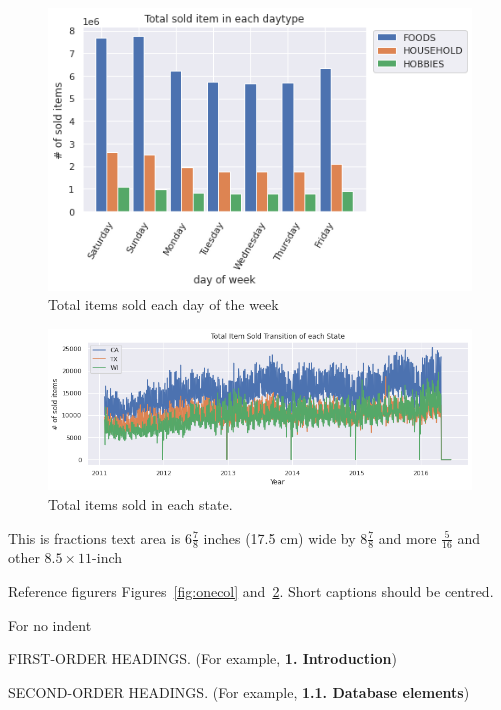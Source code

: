 \documentclass[10pt,twocolumn,letterpaper]{article}
\begin{document}
\begin{figure}
  \begin{center}
    \includegraphics[width=0.8\linewidth]{img/totalSoldItemInEachDayOfWeek.png}
  \end{center}
    \caption{Total items sold each day of the week}
  \label{fig:short}
\end{figure}

\begin{figure}
  \begin{center}
    \includegraphics[width=0.8\linewidth]{img/totalItemSoldInEachState.png}
  \end{center}
    \caption{Total items sold in each state.}
  \label{fig:short}
\end{figure}


This is fractions text area is $6\frac78$ inches (17.5 cm) wide by $8\frac78$
and more $\frac{5}{16}$ and other $8.5 \times 11$-inch

Reference figurers Figures~\ref{fig:onecol} and~\ref{fig:short}.  Short captions should be centred.

\noindent For no indent

FIRST-ORDER HEADINGS. (For example, {\large \bf 1. Introduction})

SECOND-ORDER HEADINGS. (For example, { \bf 1.1. Database elements})
\end{document}
